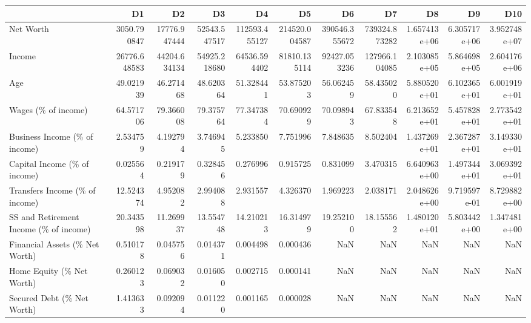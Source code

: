 \begin{tabular}{lrrrrrrrrrr}
\toprule
{} &            D1 &            D2 &            D3 &             D4 &             D5 &             D6 &             D7 &            D8 &            D9 &           D10 \\
\midrule
Net Worth                              &   3050.790847 &  17776.947444 &  52543.547517 &  112593.455127 &  214520.004587 &  390546.355672 &  739324.873282 &  1.657413e+06 &  6.305717e+06 &  3.952748e+07 \\
Income                                 &  26776.648583 &  44204.634134 &  54925.218680 &   64536.594402 &   81810.135114 &   92427.053236 &  127966.104085 &  2.103085e+05 &  5.864698e+05 &  2.604176e+06 \\
Age                                    &     49.021939 &     46.271468 &     48.620364 &      51.328441 &      53.875203 &      56.062459 &      58.435020 &  5.880520e+01 &  6.102365e+01 &  6.001919e+01 \\
Wages (\% of income)                    &     64.571706 &     79.366008 &     79.375764 &      77.347384 &      70.690929 &      70.098943 &      67.833548 &  6.213652e+01 &  5.457828e+01 &  2.773542e+01 \\
Business Income (\% of income)          &      2.534759 &      4.192794 &      3.746945 &       5.233850 &       7.751996 &       7.848635 &       8.502404 &  1.437269e+01 &  2.367287e+01 &  3.149330e+01 \\
Capital Income (\% of income)           &      0.025564 &      0.219179 &      0.328456 &       0.276996 &       0.915725 &       0.831099 &       3.470315 &  6.640963e+00 &  1.497344e+01 &  3.069392e+01 \\
Transfers Income (\% of income)         &     12.524374 &      4.952082 &      2.994088 &       2.931557 &       4.326370 &       1.969223 &       2.038171 &  2.048626e+00 &  9.719597e-01 &  8.729882e+00 \\
SS and Retirement Income (\% of income) &     20.343598 &     11.269937 &     13.554748 &      14.210213 &      16.314979 &      19.252100 &      18.155562 &  1.480120e+01 &  5.803442e+00 &  1.347481e+00 \\
Financial Assets (\% Net Worth)         &      0.510178 &      0.045756 &      0.014371 &       0.004498 &       0.000436 &            NaN &            NaN &           NaN &           NaN &           NaN \\
Home Equity (\% Net Worth)              &      0.260123 &      0.069032 &      0.016050 &       0.002715 &       0.000141 &            NaN &            NaN &           NaN &           NaN &           NaN \\
Secured Debt (\% Net Worth)             &      1.413633 &      0.092094 &      0.011220 &       0.001165 &       0.000028 &            NaN &            NaN &           NaN &           NaN &           NaN \\
\bottomrule
\end{tabular}
